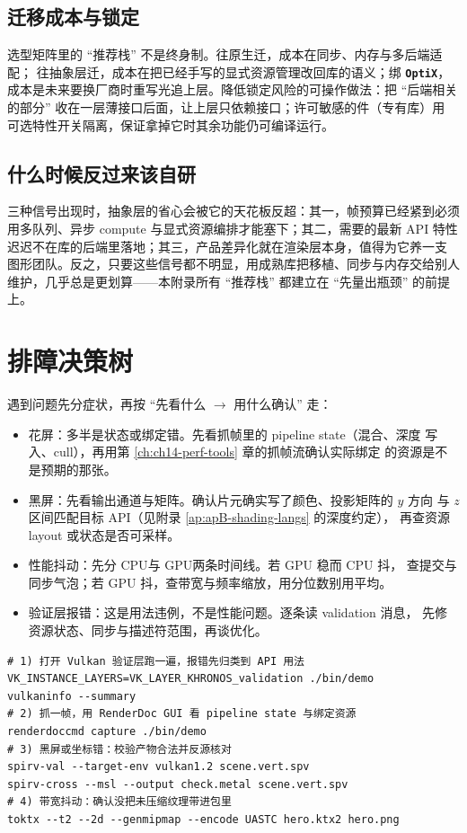 \documentclass[12pt,a4paper,fontset=fandol]{ctexbook}
\newcommand{\Lib}[1]{\textbf{\texttt{#1}}}
\newcommand{\Lang}[1]{\textsf{#1}}
\newcommand{\DomCPU}{\Lang{CPU}}
\newcommand{\DomGPU}{\Lang{GPU}}
\begin{document}
\subsection{迁移成本与锁定}

选型矩阵里的 ``推荐栈'' 不是终身制。往原生迁，成本在同步、内存与多后端适配；
往抽象层迁，成本在把已经手写的显式资源管理改回库的语义；绑 \Lib{OptiX}，
成本是未来要换厂商时重写光追上层。降低锁定风险的可操作做法：把 ``后端相关
的部分'' 收在一层薄接口后面，让上层只依赖接口；许可敏感的件（专有库）用
可选特性开关隔离，保证拿掉它时其余功能仍可编译运行。

\subsection{什么时候反过来该自研}

三种信号出现时，抽象层的省心会被它的天花板反超：其一，帧预算已经紧到必须
用多队列、异步 compute 与显式资源编排才能塞下；其二，需要的最新 API 特性
迟迟不在库的后端里落地；其三，产品差异化就在渲染层本身，值得为它养一支
图形团队。反之，只要这些信号都不明显，用成熟库把移植、同步与内存交给别人
维护，几乎总是更划算——本附录所有 ``推荐栈'' 都建立在 ``先量出瓶颈'' 的前提上。

\section{排障决策树}

遇到问题先分症状，再按 ``先看什么 $\rightarrow$ 用什么确认'' 走：
\begin{itemize}
  \item 花屏：多半是状态或绑定错。先看抓帧里的 pipeline state（混合、深度
        写入、cull），再用第 \ref{ch:ch14-perf-tools} 章的抓帧流确认实际绑定
        的资源是不是预期的那张。
  \item 黑屏：先看输出通道与矩阵。确认片元确实写了颜色、投影矩阵的 $y$ 方向
        与 $z$ 区间匹配目标 API（见附录 \ref{ap:apB-shading-langs} 的深度约定），
        再查资源 layout 或状态是否可采样。
  \item 性能抖动：先分 \DomCPU 与 \DomGPU 两条时间线。若 GPU 稳而 CPU 抖，
        查提交与同步气泡；若 GPU 抖，查带宽与频率缩放，用分位数别用平均。
  \item 验证层报错：这是用法违例，不是性能问题。逐条读 validation 消息，
        先修资源状态、同步与描述符范围，再谈优化。
\end{itemize}

\begin{lstlisting}[style=shellstyle,caption={排障常用命令：验证层、抓帧与校验},label={lst:apC-debug}]
# 1) 打开 Vulkan 验证层跑一遍，报错先归类到 API 用法
VK_INSTANCE_LAYERS=VK_LAYER_KHRONOS_validation ./bin/demo
vulkaninfo --summary
# 2) 抓一帧，用 RenderDoc GUI 看 pipeline state 与绑定资源
renderdoccmd capture ./bin/demo
# 3) 黑屏或坐标错：校验产物合法并反源核对
spirv-val --target-env vulkan1.2 scene.vert.spv
spirv-cross --msl --output check.metal scene.vert.spv
# 4) 带宽抖动：确认没把未压缩纹理带进包里
toktx --t2 --2d --genmipmap --encode UASTC hero.ktx2 hero.png
\end{lstlisting}
\end{document}
